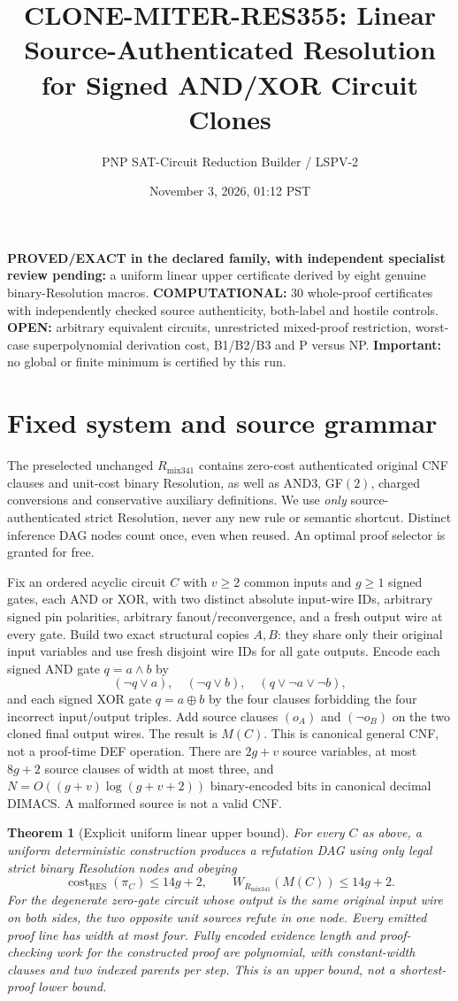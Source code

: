 \documentclass[11pt]{article}
\title{CLONE-MITER-RES355: Linear Source-Authenticated Resolution for Signed AND/XOR Circuit Clones}
\author{PNP SAT-Circuit Reduction Builder / LSPV-2}
\date{November 3, 2026, 01:12 PST}
\newtheorem{theorem}{Theorem}
\begin{document}
\maketitle
\noindent\textbf{PROVED/EXACT in the declared family, with independent specialist review pending:} a uniform linear upper certificate derived by eight genuine binary-Resolution macros. \textbf{COMPUTATIONAL:} 30 whole-proof certificates with independently checked source authenticity, both-label and hostile controls. \textbf{OPEN:} arbitrary equivalent circuits, unrestricted mixed-proof restriction, worst-case superpolynomial derivation cost, B1/B2/B3 and P versus NP. \textbf{Important:} no global or finite minimum is certified by this run.

\section*{Fixed system and source grammar}
The preselected unchanged $R_{\mathrm{mix341}}$ contains zero-cost authenticated original CNF clauses and unit-cost binary Resolution, as well as AND3, GF$(2)$, charged conversions and conservative auxiliary definitions. We use \emph{only} source-authenticated strict Resolution, never any new rule or semantic shortcut. Distinct inference DAG nodes count once, even when reused. An optimal proof selector is granted for free.

Fix an ordered acyclic circuit $C$ with $v\ge2$ common inputs and $g\ge1$ signed gates, each AND or XOR, with two distinct absolute input-wire IDs, arbitrary signed pin polarities, arbitrary fanout/reconvergence, and a fresh output wire at every gate. Build two exact structural copies $A,B$: they share only their original input variables and use fresh disjoint wire IDs for all gate outputs. Encode each signed AND gate $q=a\wedge b$ by
\[
(\neg q\vee a),\quad(\neg q\vee b),\quad(q\vee\neg a\vee\neg b),
\]
and each signed XOR gate $q=a\oplus b$ by the four clauses forbidding the four incorrect input/output triples. Add source clauses $(o_A)$ and $(\neg o_B)$ on the two cloned final output wires. The result is $M(C)$. This is canonical general CNF, not a proof-time DEF operation. There are $2g+v$ source variables, at most $8g+2$ source clauses of width at most three, and $N=O((g+v)\log(g+v+2))$ binary-encoded bits in canonical decimal DIMACS. A malformed source is not a valid CNF.

\begin{theorem}[Explicit uniform linear upper bound]
For every $C$ as above, a uniform deterministic construction produces a refutation DAG using only legal strict binary Resolution nodes and obeying
\[
\boxed{\operatorname{cost}_{\mathrm{RES}}(\pi_C)\le14g+2,\qquad W_{R_{\mathrm{mix341}}}(M(C))\le14g+2.}
\]
For the degenerate zero-gate circuit whose output is the same original input wire on both sides, the two opposite unit sources refute in one node. Every emitted proof line has width at most four. Fully encoded evidence length and proof-checking work for the constructed proof are polynomial, with constant-width clauses and two indexed parents per step. This is an upper bound, not a shortest-proof lower bound.
\end{theorem}
\end{document}
